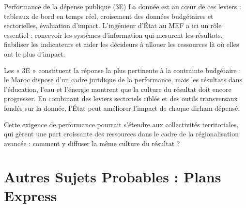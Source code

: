 \begin{copiemodele}{Performance de la dépense publique (3E)}
La donnée est au cœur de ces leviers : tableaux de bord en temps réel, croisement des données budgétaires et sectorielles, évaluation d'impact. L'ingénieur d'État au MEF a ici un rôle essentiel : concevoir les systèmes d'information qui mesurent les résultats, fiabiliser les indicateurs et aider les décideurs à allouer les ressources là où elles ont le plus d'impact.

Les « 3E » constituent la réponse la plus pertinente à la contrainte budgétaire : le Maroc dispose d'un cadre juridique de la performance, mais les résultats dans l'éducation, l'eau et l'énergie montrent que la culture du résultat doit encore progresser. En combinant des leviers sectoriels ciblés et des outils transversaux fondés sur la donnée, l'État peut améliorer l'impact de chaque dirham dépensé.

Cette exigence de performance pourrait s'étendre aux collectivités territoriales, qui gèrent une part croissante des ressources dans le cadre de la régionalisation avancée : comment y diffuser la même culture du résultat ?
\end{copiemodele}

\section{Autres Sujets Probables : Plans Express}

